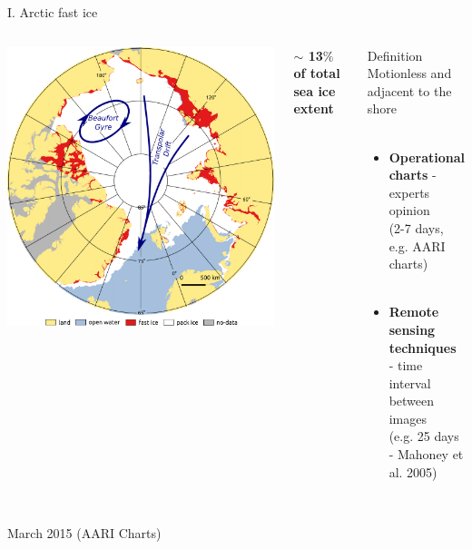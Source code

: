 \documentclass[8pt]{beamer}
\newcommand\Fontvi{\fontsize{6}{7.2}\selectfont}
\begin{document}
\setwatermark{\fontsize{125pt}{125pt}\selectfont{}}
\begin{frame}[fragile]{I. Arctic fast ice}
	\begin{columns}
		\includegraphics[width=1\textwidth]{./img/ArcticSI_Mar2015_circ.pdf}\\
				\begin{block}{\centering}
					\begin{center}
						\textbf{$\sim$ 13$\%$ of total sea ice extent}
					\end{center}
				\end{block}
				
				\begin{block}{\centering Definition}
					\centering
				Motionless and adjacent to the shore\\~\\
					\begin{itemize}
						\item \textbf{Operational charts} - experts opinion\\
						 (2-7 days, e.g. AARI charts)\\~\\
						\item \textbf{Remote sensing techniques}\\ - time interval between images\\
						 (e.g. 25 days - Mahoney et al. 2005)
					\end{itemize}
				\end{block}

	\end{columns}
~\\
\Fontvi
17 March 2015 (AARI Charts)
\end{frame}
\end{document}
